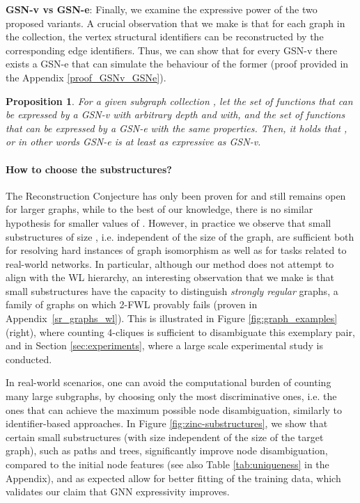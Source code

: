 \documentclass{article} \usepackage{iclr2021_conference,times}
\newtheorem{proposition}{Proposition}[section]
\begin{document}
\noindent\textbf{GSN-v vs GSN-e}: Finally, we examine the expressive power of the two proposed variants. A crucial observation that we make is that for each graph  in the collection, the vertex structural identifiers can be reconstructed by the corresponding edge identifiers. Thus, we can show that for every GSN-v there exists a GSN-e that can simulate the behaviour of the former (proof provided in the Appendix \ref{proof_GSNv_GSNe}).

\begin{proposition}\label{GSN-v vs GSN-e}
For a given subgraph collection , let  the set of functions that can be expressed by a GSN-v with arbitrary depth and with, and  the set of functions that can be expressed by a GSN-e with the same properties. Then, it holds that , or in other words GSN-e is at least as expressive as GSN-v.
\end{proposition}


\paragraph {How to choose the substructures?}
The Reconstruction Conjecture has only been proven for  \citep{mckay1997small} and still remains open for larger graphs, while to the best of our knowledge, there is no similar hypothesis for smaller values of . However, in practice we observe that small substructures of size , i.e. independent of the size of the graph, are sufficient both for resolving hard instances of graph isomorphism as well as for tasks related to real-world networks. In particular, although our method does not attempt to align with the WL hierarchy, an interesting observation that we make is that small substructures have the capacity to distinguish \textit{strongly regular} graphs, a family of graphs on which 2-FWL provably fails (proven in Appendix~\ref{sr_graphs_wl}). This is illustrated in Figure \ref{fig:graph_examples} (right), where counting 4-cliques is sufficient to disambiguate this exemplary pair, and in Section \ref{sec:experiments}, where a large scale experimental study is conducted. 

In real-world scenarios, one can avoid the computational burden of counting many large subgraphs, by choosing only the most discriminative ones, i.e. the ones that can achieve the maximum possible node disambiguation, similarly to identifier-based approaches. In Figure \ref{fig:zinc-substructures}, we show that certain small substructures (with size independent of the size of the target graph),  such as paths and trees, significantly improve node disambiguation, compared to the initial node features (see also Table \ref{tab:uniqueness} in the Appendix), and as expected allow for better fitting of the training data, which validates our claim that GNN expressivity improves. 
\end{document}
